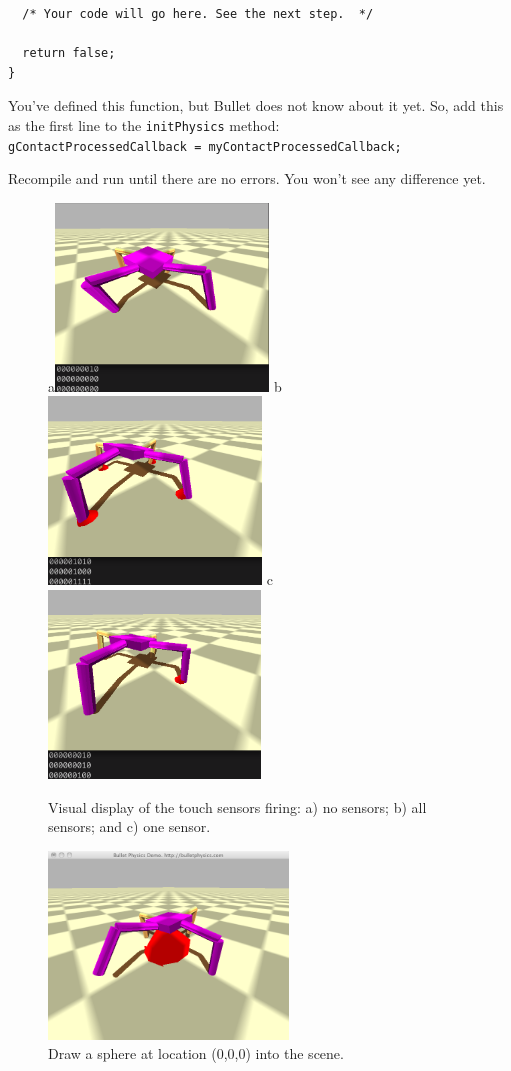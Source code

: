 \documentclass[12pt]{article}
\begin{document}
\begin{enumerate}
\begin{verbatim}
  /* Your code will go here. See the next step.  */

  return false;
}
\end{verbatim}  

You've defined this function, but Bullet does not know about it yet.  So, add this as the first line to the \verb|initPhysics| method: \\\verb|gContactProcessedCallback = myContactProcessedCallback;|

Recompile and run until there are no errors.  You won't see any difference yet.

\begin{figure}
\centerline{
a\includegraphics[height=5cm]{Fig2a}
b\includegraphics[height=5cm]{Fig2b}
c\includegraphics[height=5cm]{Fig2c}}
\caption{Visual display of the touch sensors firing: a) no sensors; b) all sensors; and c) one sensor.}
\label{Fig2} %
\end{figure}

\begin{figure}
\centerline{
\includegraphics[height=5cm]{Fig1}}
\caption{Draw a sphere at location (0,0,0) into the scene.}
\label{Fig1}
\end{figure}



\end{enumerate}
\end{document}
